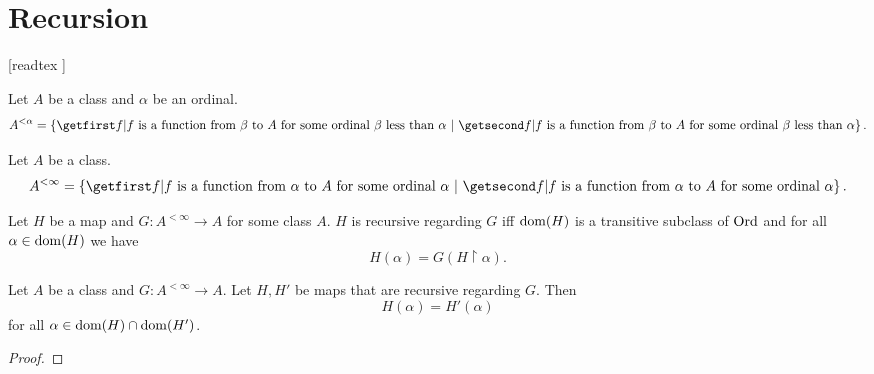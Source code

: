 \documentclass[../set-theory.tex]{subfiles}
\begin{document}
  \chapter{Recursion}


  \begin{forthel}

    [readtex ]

  \end{forthel}


  \begin{forthel}
    \begin{definition}
      Let $A$ be a class and $\alpha$ be an ordinal.
      \[ A^{< \alpha} = \class{f | \text{$f$ is a function from $\beta$ to $A$
      for some ordinal $\beta$ less than $\alpha$}}. \]
    \end{definition}
  \end{forthel}

  \begin{forthel}
    \begin{definition}
      Let $A$ be a class.
      \[ A^{< \infty} = \class{f | \text{$f$ is a function from $\alpha$ to $A$
      for some ordinal $\alpha$}}. \]
    \end{definition}
  \end{forthel}

  \begin{forthel}
    \begin{definition}
      Let $H$ be a map and $G : A^{< \infty} \to A$ for some class $A$.
      $H$ is recursive regarding $G$ iff $\operatorname{dom}(H)$ is a transitive subclass of
      $\mathrm{Ord}$ and for all $\alpha \in \operatorname{dom}(H)$ we have
      \[ H(\alpha) = G(H \restriction \alpha). \]
    \end{definition}
  \end{forthel}

  \begin{forthel}
    \begin{proposition}
      Let $A$ be a class and $G : A^{< \infty} \to A$.
      Let $H, H'$ be maps that are recursive regarding $G$.
      Then \[ H(\alpha) = H'(\alpha) \]
      for all $\alpha \in \operatorname{dom}(H) \cap \operatorname{dom}(H')$.
    \end{proposition}
    \begin{proof}
    \end{proof}
  \end{forthel}
\end{document}
